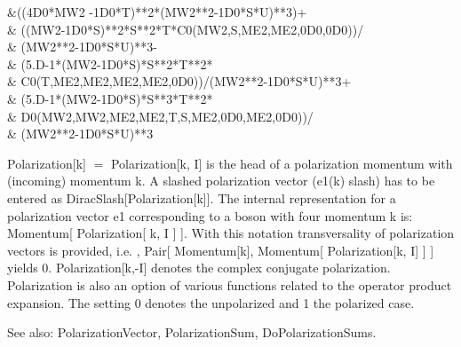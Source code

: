 {	\multsp \multsp \multsp \multsp \multsp \&\multsp \multsp \multsp ((4D0*MW2\multsp
    -\multsp 1D0*T)**2*(MW2**2\multsp -\multsp 1D0*S*U)**3)\multsp +\multsp  \\
	\multsp \multsp \multsp \multsp \multsp \&\multsp
    \multsp ((MW2\multsp -\multsp 1D0*S)**2*S**2*T*C0(MW2,S,ME2,ME2,0D0,0D0))/ \\
	\multsp \multsp \multsp \multsp \multsp \&\multsp
    \multsp \multsp (MW2**2\multsp -\multsp 1D0*S*U)**3\multsp -\multsp  \\
	\multsp \multsp \multsp \multsp \multsp \&\multsp \multsp
    (5.D-1*(MW2\multsp -\multsp 1D0*S)*S**2*T**2* \\
	\multsp \multsp \multsp \multsp \multsp \&\multsp \multsp \multsp \multsp \multsp
    C0(T,ME2,ME2,ME2,ME2,0D0))/(MW2**2\multsp -\multsp 1D0*S*U)**3\multsp +\multsp  \\
	\multsp \multsp \multsp \multsp \multsp \&\multsp
    \multsp (5.D-1*(MW2\multsp -\multsp 1D0*S)*S**3*T**2* \\
	\multsp \multsp \multsp \multsp \multsp \&\multsp \multsp \multsp \multsp
    \multsp D0(MW2,MW2,ME2,ME2,T,S,ME2,0D0,ME2,0D0))/ \\
	\multsp \multsp \multsp \multsp \multsp \&\multsp \multsp \multsp
    (MW2**2\multsp -\multsp 1D0*S*U)**3 \\
	\multsp \multsp \multsp \multsp \multsp \multsp \multsp \multsp \multsp \multsp \multsp
    \multsp \multsp \multsp \multsp \multsp \multsp \multsp  
}



Polarization[k] \(=\) Polarization[k, I] is the head of a polarization momentum with (incoming) momentum k. A slashed polarization vector
  (e1(k) slash) has to be entered as DiracSlash[Polarization[k]]. The internal representation for a polarization vector e1 corresponding
  to a boson with four momentum k is: Momentum[ Polarization[ k, I ] ]. With this notation transversality of polarization vectors is
  provided, i.e. , Pair[ Momentum[k], Momentum[ Polarization[k, I] ] ] yields 0. Polarization[k,-I] denotes the complex conjugate
  polarization. Polarization is also an option of various functions related to the operator product expansion. The setting 0 denotes the
  unpolarized and 1 the polarized case.

See also:  PolarizationVector, PolarizationSum, DoPolarizationSums.


